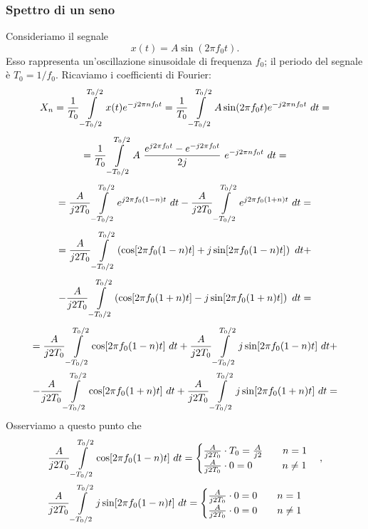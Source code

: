 \documentclass[12pt,oneside,openany]{memoir}
\numberwithin{equation}{subsection}
\newcommand{\dt}{\ dt}
\begin{document}
\subsubsection{Spettro di un seno}
Consideriamo il segnale
\begin{equation}
	x(t) = A \sin(2 \pi f_0 t).
\end{equation}
Esso rappresenta un'oscillazione sinusoidale di frequenza $f_0$; il periodo del
segnale \`e $T_0 = 1/f_0$. Ricaviamo i coefficienti di Fourier:
\[
	X_n = \frac{1}{T_0} \int\displaylimits_{-T_0/2}^{T_0/2} x(t)
	e^{-j 2 \pi n f_0 t} = \frac{1}{T_0} \int\displaylimits_{-T_0/2}^{T_0/2}
	A \sin(2 \pi f_0 t) e^{-j 2 \pi n f_0 t} \dt =
\]
\[
	= \frac{1}{T_0} \int\displaylimits_{-T_0/2}^{T_0/2} A \ 
	\frac{e^{j 2 \pi f_0 t} - e^{-j 2 \pi f_0 t}}{2j} \ e^{-j 2 \pi n f_0 t}
	\dt =
\]
\[
	= \frac{A}{j 2 T_0} \int\displaylimits_{-T_0/2}^{T_0/2}
	e^{j 2 \pi f_0 (1 - n) t} \dt - \frac{A}{j 2 T_0}
	\int\displaylimits_{-T_0/2}^{T_0/2} e^{j 2 \pi f_0 (1 + n) t} \dt =
\]
\[
	= \frac{A}{j 2 T_0} \int\displaylimits_{-T_0/2}^{T_0/2} \left(
	\cos[2 \pi f_0 (1 - n) t] + j \sin[2 \pi f_0 (1 - n) t] \right) \dt +
\]
\[
	- \frac{A}{j 2 T_0} \int\displaylimits_{-T_0/2}^{T_0/2} \left(
	\cos[2 \pi f_0 (1 + n) t] - j \sin[2 \pi f_0 (1 + n) t] \right) \dt =
\]
\begin{equation}
	\begin{split}
		= \frac{A}{j 2 T_0} \int\displaylimits_{-T_0/2}^{T_0/2}
		\cos[2 \pi f_0 (1 - n) t] \dt + \frac{A}{j 2 T_0}
		\int\displaylimits_{-T_0/2}^{T_0/2} j \sin[2 \pi f_0 (1 - n) t]
		\dt +
		\\
		- \frac{A}{j 2 T_0} \int\displaylimits_{-T_0/2}^{T_0/2}
		\cos[2 \pi f_0 (1 + n) t] \dt + \frac{A}{j 2 T_0}
		\int\displaylimits_{-T_0/2}^{T_0/2} j \sin[2 \pi f_0 (1 + n) t]
		\dt =
	\end{split}
\end{equation}
Osserviamo a questo punto che
\begin{equation}
	\begin{split}
		\frac{A}{j 2 T_0} \int\displaylimits_{-T_0/2}^{T_0/2} \cos[2 \pi f_0 (1 - n) t] \dt =
			\begin{cases}
				\frac{A}{j 2 T_0} \cdot T_0 = \frac{A}{j 2} \quad\quad n = 1\\
				\frac{A}{j 2 T_0} \cdot 0 = 0 \quad\quad \ \ \ n \neq 1
			\end{cases},
		\\
		\frac{A}{j 2 T_0} \int\displaylimits_{-T_0/2}^{T_0/2} j \sin[2 \pi f_0 (1 - n) t] \dt =
			\begin{cases}
				\frac{A}{j 2 T_0} \cdot 0 = 0 \quad\quad n = 1\\
				\frac{A}{j 2 T_0} \cdot 0 = 0 \quad\quad n \neq 1
			\end{cases}
			\quad
	\end{split}
\end{equation}
\end{document}
